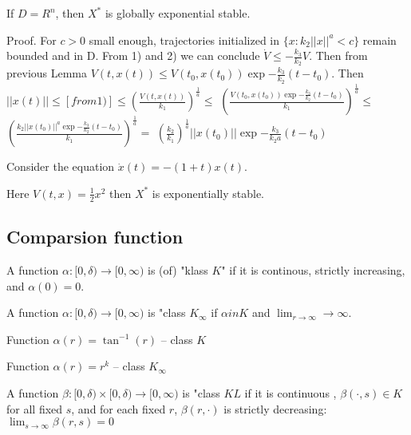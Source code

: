  If $D=R^n$, then $X^*$ is globally exponential stable.

 Proof. For $c>0$ small enough, trajectories initialized in $\{x:k_2||x||^a<c\}$
 remain bounded and in D. From 1) and 2) we can conclude 
 $\dot V \le -\frac{k_3}{k_2}V$. Then from previous Lemma 
 $V(t,x(t)) \le V(t_0,x(t_0))\exp{-\frac{k_3}{k_2}(t-t_0)}$. Then
 $||x(t)|| \le [from 1)] \le \left( \frac{V(t,x(t))}{k_1}\right)^{\frac{1}{a}} \le$
 $\left(\frac{V(t_0,x(t_0))\exp{-\frac{k_3}{k_2}(t-t_0)}}{k_1}\right)^{\frac{1}{a}} \le$ 
 $\left(\frac{k_2||x(t_0)||^a\exp{-\frac{k_3}{k_2}(t-t_0)}}{k_1}\right)^{\frac{1}{a}} =$
 $\left( \frac{k_2}{k_1}\right)^{\frac{1}{a}} ||x(t_0)||\exp{-\frac{k_3}{k_2a}(t-t_0)}$

 Consider the equation $\dot x(t) = -(1+t)x(t)$.

 Here $V(t,x)=\frac{1}{2}x^2$ then $X^*$  is exponentially stable.


\subsection{Comparsion function}

 A function $\alpha:[0,\delta)\to [0, \infty)$ is (of) "klass $K$" if it is continous,
 strictly increasing, and $\alpha(0)=0$.

 A function $\alpha:[0,\delta)\to [0, \infty)$ is "class $K_\infty$ if $\alpha in K$
 and $\lim_{r\to\infty} \to\infty$.


 Function $\alpha(r)=\tan^{-1}(r)$ -- class $K$

 Function $\alpha(r)=r^k$ -- class $K_\infty$

 A function $\beta:[0,\delta)\times[0,\delta)\to [0, \infty)$ is "class $KL$ if it is continuous
 , $\beta(\cdot, s) \in K$ for all fixed $s$, and for each fixed $r$, $\beta(r, \cdot)$ is
 strictly decreasing: $\lim_{s\to\infty}\beta(r,s)=0$

